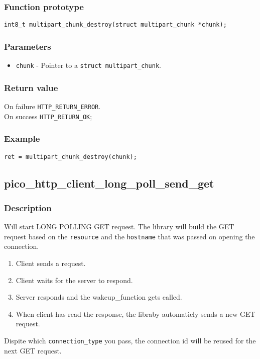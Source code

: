 \subsubsection*{Function prototype}
\texttt{int8\_t multipart\_chunk\_destroy(struct multipart\_chunk *chunk);}

\subsubsection*{Parameters}
\begin{itemize}[noitemsep]
\item \texttt{chunk} - Pointer to a \texttt{struct multipart\_chunk}.
\end{itemize}
\subsubsection*{Return value}
On failure \texttt{HTTP\_RETURN\_ERROR}.
\\On success \texttt{HTTP\_RETURN\_OK};
\subsubsection*{Example}
\begin{verbatim}
ret = multipart_chunk_destroy(chunk);
\end{verbatim}



\subsection{pico\_http\_client\_long\_poll\_send\_get}

\subsubsection*{Description}
Will start LONG POLLING GET request. The library will build the GET request based on the \texttt{resource} and the \texttt{hostname} that was passed on opening the connection. 
\begin{enumerate}
\item Client sends a request.
\item Client waits for the server to respond.
\item Server responds and the wakeup\_function gets called.
\item When client has read the response, the libraby automaticly sends a new GET request.
\end{enumerate}
Dispite which \texttt{connection\_type} you pass, the connection id will be reused for the next GET request.
